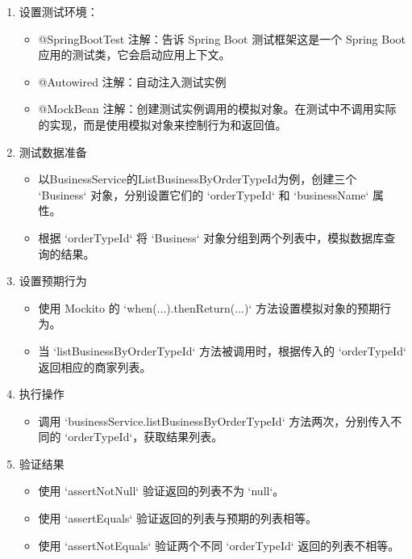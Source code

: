 \begin{enumerate}


\item 设置测试环境：
\begin{itemize}
    \item @SpringBootTest 注解：告诉 Spring Boot 测试框架这是一个 Spring Boot 应用的测试类，它会启动应用上下文。
    \item @Autowired 注解：自动注入测试实例
    \item @MockBean 注解：创建测试实例调用的模拟对象。在测试中不调用实际的实现，而是使用模拟对象来控制行为和返回值。
\end{itemize}


\item 测试数据准备
\begin{itemize}
    \item 以BusinessService的ListBusinessByOrderTypeId为例，创建三个 `Business` 对象，分别设置它们的 `orderTypeId` 和 `businessName` 属性。
    \item 根据 `orderTypeId` 将 `Business` 对象分组到两个列表中，模拟数据库查询的结果。
\end{itemize}


\item  设置预期行为
\begin{itemize}
    \item 使用 Mockito 的 `when(...).thenReturn(...)` 方法设置模拟对象的预期行为。
    \item 当 `listBusinessByOrderTypeId` 方法被调用时，根据传入的 `orderTypeId` 返回相应的商家列表。
\end{itemize}


\item 执行操作

\begin{itemize}
    \item 调用 `businessService.listBusinessByOrderTypeId` 方法两次，分别传入不同的 `orderTypeId`，获取结果列表。
\end{itemize}

\item  验证结果

\begin{itemize}
    \item 使用 `assertNotNull` 验证返回的列表不为 `null`。
    \item 使用 `assertEquals` 验证返回的列表与预期的列表相等。
    \item 使用 `assertNotEquals` 验证两个不同 `orderTypeId` 返回的列表不相等。
\end{itemize}


\end{enumerate}
